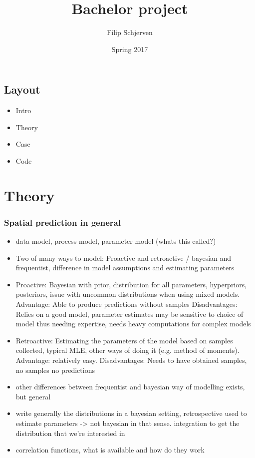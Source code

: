 \documentclass{report}
\title{Bachelor project}
\author{Filip Schjerven}
\date{Spring 2017}
\begin{document}
\maketitle
\section{Layout}
\begin{itemize}
\item Intro
\item Theory
\item Case
\item Code
\end{itemize}

\chapter{Theory}
\subsection{Spatial prediction in general}
\begin{itemize}
\item data model, process model,  parameter model (whats this called?)
\item Two of many ways to model: Proactive and retroactive / bayesian and frequentist, difference in model assumptions and estimating parameters 

\item Proactive: Bayesian with prior, distribution for all parameters, hyperpriors, posteriors, issue with uncommon distributions when using mixed models. Advantage: Able to produce predictions without samples Disadvantages: Relies on a good model, parameter estimates may be sensitive to choice of model thus needing expertise, needs heavy computations for complex models

\item Retroactive: Estimating the parameters of the model based on samples collected, typical MLE, other ways of doing it (e.g. method of moments). Advantage: relatively easy. Disadvantages: Needs to have obtained samples, no samples no predictions

\item other differences between frequentist and bayesian way of modelling exists, but general

\item write generally the distributions in a bayesian setting, retrospective used to estimate parameters -> not bayesian in that sense. integration to get the distribution that we're interested in

\item correlation functions, what is available and how do they work
\end{itemize}
\end{document}
